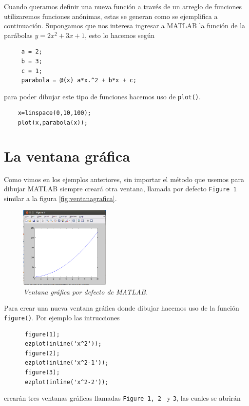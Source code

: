 \documentclass[11pt]{article}
\begin{document}
    Cuando queramos definir una nueva funci\'on a trav\'es de un arreglo 
    de funciones utilizaremos funciones an\'onimas, estas se generan como 
    se ejemplifica a continuaci\'on. Supongamos que nos interesa ingresar a MATLAB
    la funci\'on de la par\'abolas $y=2x^2+3x+1$, esto lo hacemos seg\'un
    \begin{verbatim}
     a = 2;
     b = 3;
     c = 1;
     parabola = @(x) a*x.^2 + b*x + c;
    \end{verbatim}
    para poder dibujar este tipo de funciones hacemos uso de \texttt{plot()}.
    \begin{verbatim}
    x=linspace(0,10,100);
    plot(x,parabola(x));
    \end{verbatim}
    
    \section{La ventana gr\'afica}
      Como vimos en los ejemplos anteriores, sin importar el m\'etodo que usemos para dibujar MATLAB siempre 
      crear\'a otra ventana, llamada por defecto \texttt{Figure 1} similar a la figura \eqref{fig:ventanagrafica}. 
      \begin{figure}[htp]
      \begin{center}
      \includegraphics[width=0.4\textwidth]{./ventanafigure.png}
      \caption{\sl Ventana gr\'afica por defecto de MATLAB.}
      \label{fig:ventanagrafica}
      \end{center}
      \end{figure}
     Para crear una nueva ventana gr\'afica donde dibujar hacemos uso de la funci\'on \texttt{figure()}. Por 
     ejemplo las intrucciones
     \begin{verbatim}
      figure(1);
      ezplot(inline('x^2'));
      figure(2);
      ezplot(inline('x^2-1'));
      figure(3);
      ezplot(inline('x^2-2'));
     \end{verbatim}
     crear\'an tres ventanas gr\'aficas llamadas \texttt{Figure 1, 2 } y \texttt{3}, las cuales se abrir\'an 
\end{document}
